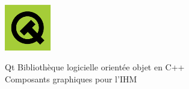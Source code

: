 {\begin{minipage}{0.45\textwidth}
\begin{flushleft}
\begin{center}
\includegraphics[width=2cm]{logo-qt.png}
\end{center}
\end{flushleft}
\end{minipage}
\begin{minipage}{0.45\textwidth}
\begin{flushright}
\begin{block}{Qt}
Biblioth\`eque logicielle orient\'ee objet en C++\\
Composants graphiques pour l'IHM\\
\end{block}
\end{flushright}
\end{minipage}
}